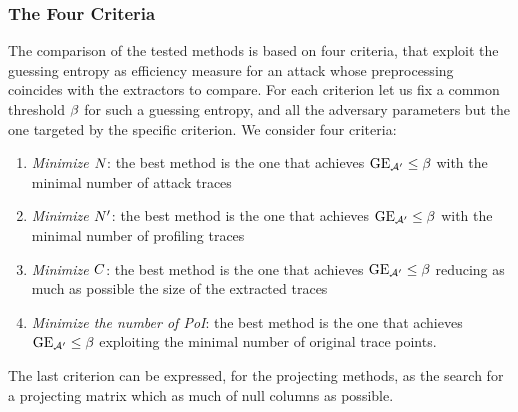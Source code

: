 \subsubsection{The Four Criteria}
The comparison of the tested methods is based on four criteria, that exploit the guessing entropy as efficiency measure for an attack whose preprocessing coincides with the extractors to compare. For each criterion let us fix a common threshold $\threshold$ for such a guessing entropy, and all the adversary parameters but the one targeted by the specific criterion. We consider four criteria: 
\begin{enumerate}
\item {\em Minimize $\numTraces[]$}: the best method is the one that achieves $\guessingEntropy_{\adversary'}\leq \threshold$ with the minimal number of attack traces
\item {\em Minimize $\numTraces[]'$}: the best method is the one that achieves $\guessingEntropy_{\adversary'}\leq \threshold$ with the minimal number of profiling traces
\item {\em Minimize $\newTraceLength$}: the best method is the one that achieves $\guessingEntropy_{\adversary'}\leq \threshold$ reducing as much as possible the size of the extracted traces
\item {\em Minimize the number of PoI}: the best method is the one that achieves $\guessingEntropy_{\adversary'}\leq \threshold$ exploiting the minimal number of original trace points.
\end{enumerate}
The last criterion can be expressed, for the projecting methods, as the search for a projecting matrix which as much of null columns as possible. 













